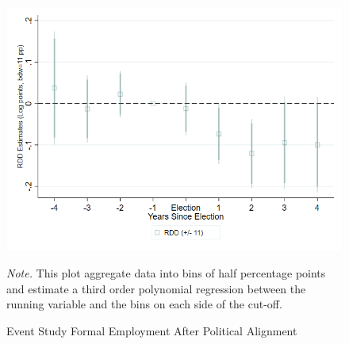 \documentclass[dv_diss_main.tex]{subfiles}
\begin{document}
\newpage

\begin{figure}[h]
	\begin{center}
    	\includegraphics[width=0.8\linewidth]{figures/sdevent_itt_rdd_f_emp_bd_11_th1.png}
    	\caption{Event Study Formal Employment After Political Alignment }
	\end{center}
	\vspace{0.5em}
    \begin{figurenotes}
    {\footnotesize	
	\textit{Note. }This plot aggregate data into bins of half percentage points and estimate a third order polynomial regression between the running variable and the bins on each side of the cut-off. }
	\end{figurenotes}

\end{figure}

\newpage
\end{document}
